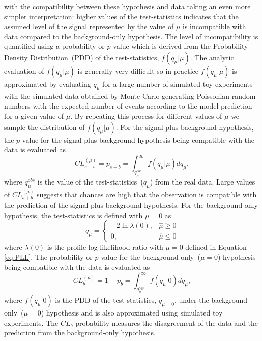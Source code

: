 with the compatibility between these hypothesis and data taking an even more simpler interpretation: higher values of the test-statistics indicates that the assumed level of the signal represented by the value of $\mu$ is incompatible with data compared to the background-only hypothesis. The level of incompatibility is quantified using a probability or $p$-value which is derived from the Probability Density Distribution~(PDD) of the test-statistics, $f(q_{\mu}|\mu)$. The analytic evaluation of $f(q_{\mu}|\mu)$ is generally very difficult so in practice $f(q_{\mu}|\mu)$ is approximated by evaluating $q_{\mu}$ for a large number of simulated toy experiments with the simulated data obtained by Monte-Carlo generating Poissonian random numbers with the expected number of events according to the model prediction for a given value of $\mu$. By repeating this process for different values of $\mu$ we sample the distribution of $f(q_{\mu}|\mu)$.
\newline
For the signal plus background hypothesis, the $p$-value for the signal plus background hypothesis being compatible with the data is evaluated as 
\begin{equation}
 CL^{(\mu)}_{s+b} = p_{s+b} = \int^{\infty}_{q^{obs}_{\mu}} f(q_{\mu}|\mu) dq_{\mu},
\end{equation}
where $q^{obs}_{\mu}$ is the value of the test-statistics~($q_{\mu}$) from the real data. Large values of $ CL^{(\mu)}_{s+b}$ suggests that chances are high that the observation is compatible with the prediction of the signal plus background hypothesis.
\newline
For the background-only hypothesis, the test-statistics  is defined with $\mu = 0$ as
\[\label{eq:HNULL}
 q_{\mu} = \left\lbrace  
  \begin{array}{ll}
 -2\ln \lambda(0), & \hat{\mu} \geq 0 \\
   0,              & \hat{\mu} \leq 0
  \end{array}
  \right.
\]
where $\lambda(0)$ is the profile log-likelihood ratio with $\mu = 0$ defined in Equation \ref{eq:PLL}.
The probability or $p$-value for the background-only~($\mu = 0$) hypothesis being compatible with the data is evaluated as
\begin{equation}\label{eq:HALT}
 CL^{(\mu)}_{b} = 1 - p_{b} = \int^{\infty}_{q^{obs}_{\mu}} f(q_{\mu}|0) dq_{\mu},
\end{equation}
where $f(q_{\mu}|0)$ is the PDD of the test-statistics, $q_{\mu = 0}$, under the background-only~($\mu = 0$) hypothesis and is also approximated using simulated toy experiments. The $CL_{b}$ probability measures the disagreement of the data and the prediction from the background-only hypothesis.
\clearpage
